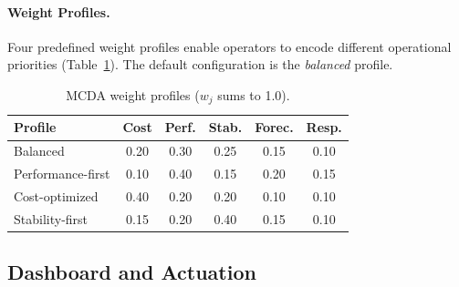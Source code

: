 \documentclass[sigconf]{acmart}
\newcommand{\Solution}{\texttt{AutoSage}}
\begin{document}
\paragraph{Weight Profiles.}
Four predefined weight profiles enable operators to encode different operational priorities (Table~\ref{tab:weights}). The default configuration is the \emph{balanced} profile.

\begin{table}[t]
\caption{MCDA weight profiles ($w_j$ sums to 1.0).}
\label{tab:weights}
\centering
\small
\begin{tabular}{@{}lccccc@{}}
\toprule
\textbf{Profile} & \textbf{Cost} & \textbf{Perf.} & \textbf{Stab.}
                  & \textbf{Forec.} & \textbf{Resp.} \\
\midrule
Balanced           & 0.20 & 0.30 & 0.25 & 0.15 & 0.10 \\
Performance-first  & 0.10 & 0.40 & 0.15 & 0.20 & 0.15 \\
Cost-optimized     & 0.40 & 0.20 & 0.20 & 0.10 & 0.10 \\
Stability-first    & 0.15 & 0.20 & 0.40 & 0.15 & 0.10 \\
\bottomrule
\end{tabular}
\end{table}

\subsection{Dashboard and Actuation}
\label{sec:dashboard}

\end{document}
